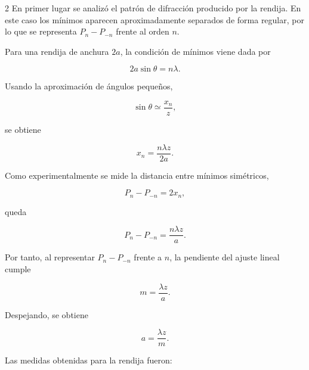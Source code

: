 \documentclass[12pt,a4paper]{article}
\begin{document}
\begin{multicols}{2}
\noindent
En primer lugar se analizó el patrón de difracción producido por la rendija. En este caso los mínimos aparecen aproximadamente separados de forma regular, por lo que se representa $P_n-P_{-n}$ frente al orden $n$.

\noindent
Para una rendija de anchura $2a$, la condición de mínimos viene dada por

\begin{equation}
  2a\sin\theta = n\lambda.
\end{equation}

\noindent
Usando la aproximación de ángulos pequeños,

\begin{equation*}
  \sin\theta \simeq \frac{x_n}{z},
\end{equation*}

\noindent
se obtiene

\begin{equation}
  x_n = \frac{n\lambda z}{2a}.
\end{equation}

\noindent
Como experimentalmente se mide la distancia entre mínimos simétricos,

\begin{equation*}
  P_n-P_{-n}=2x_n,
\end{equation*}

\noindent
queda

\begin{equation}
  P_n-P_{-n} = \frac{n\lambda z}{a}.
\end{equation}

\noindent
Por tanto, al representar $P_n-P_{-n}$ frente a $n$, la pendiente del ajuste lineal cumple

\begin{equation}
  m = \frac{\lambda z}{a}.
\end{equation}

\noindent
Despejando, se obtiene

\begin{equation}
  a = \frac{\lambda z}{m}.
  \label{eq:anchura_rendija}
\end{equation}

\noindent
Las medidas obtenidas para la rendija fueron:

\begin{table}[H]
  \centering
  \caption{Medidas para la rendija con $z_1=(2{,}935\pm0{,}005)$ m.}
  \label{tab:rendija_z1}
  \scriptsize
  \setlength{\tabcolsep}{3pt}
\end{table}


\end{multicols}
\end{document}
